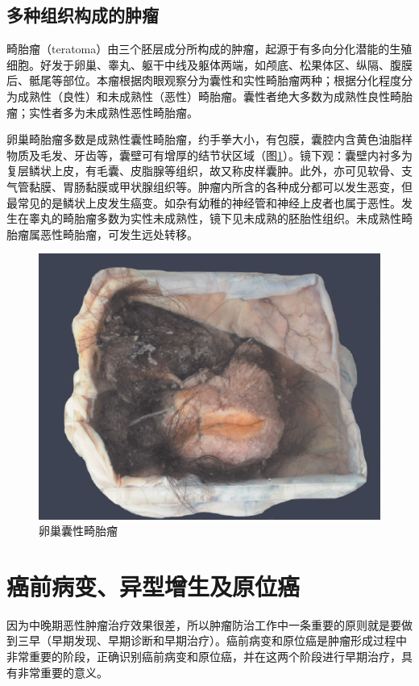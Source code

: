 \subsection{多种组织构成的肿瘤}

畸胎瘤（teratoma）由三个胚层成分所构成的肿瘤，起源于有多向分化潜能的生殖细胞。好发于卵巢、睾丸、躯干中线及躯体两端，如颅底、松果体区、纵隔、腹膜后、骶尾等部位。本瘤根据肉眼观察分为囊性和实性畸胎瘤两种；根据分化程度分为成熟性（良性）和未成熟性（恶性）畸胎瘤。囊性者绝大多数为成熟性良性畸胎瘤；实性者多为未成熟性恶性畸胎瘤。

卵巢畸胎瘤多数是成熟性囊性畸胎瘤，约手拳大小，有包膜，囊腔内含黄色油脂样物质及毛发、牙齿等，囊壁可有增厚的结节状区域（图\ref{fig5-18}）。镜下观：囊壁内衬多为复层鳞状上皮，有毛囊、皮脂腺等组织，故又称皮样囊肿。此外，亦可见软骨、支气管黏膜、胃肠黏膜或甲状腺组织等。肿瘤内所含的各种成分都可以发生恶变，但最常见的是鳞状上皮发生癌变。如杂有幼稚的神经管和神经上皮者也属于恶性。发生在睾丸的畸胎瘤多数为实性未成熟性，镜下见未成熟的胚胎性组织。未成熟性畸胎瘤属恶性畸胎瘤，可发生远处转移。

\begin{figure}[!htbp]
  \centering
  \includegraphics{./images/Image00087.jpg}
  \caption{卵巢囊性畸胎瘤}
  \label{fig5-18}
\end{figure}

\section{癌前病变、异型增生及原位癌}

因为中晚期恶性肿瘤治疗效果很差，所以肿瘤防治工作中一条重要的原则就是要做到三早（早期发现、早期诊断和早期治疗）。癌前病变和原位癌是肿瘤形成过程中非常重要的阶段，正确识别癌前病变和原位癌，并在这两个阶段进行早期治疗，具有非常重要的意义。

